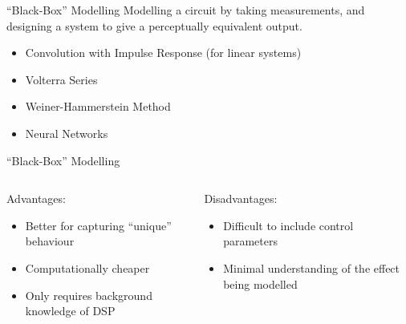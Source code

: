 \begin{frame}{``Black-Box'' Modelling}
    Modelling a circuit by taking measurements, and designing a system
    to give a perceptually equivalent output.
    \vspace{1ex}
    \begin{itemize}
        \itemsep0em
        \item Convolution with Impulse Response (for linear systems)
        \item Volterra Series
        \item Weiner-Hammerstein Method
        \item Neural Networks
    \end{itemize}
\end{frame}

\begin{frame}{``Black-Box'' Modelling}
    \begin{columns}
        \begin{column}{0.5\linewidth}
            \hspace{-1ex}
            Advantages:
            \vspace{1ex}
            \begin{itemize}
                \itemsep0.5em
                \item Better for capturing ``unique'' behaviour
                \item Computationally cheaper
                \item Only requires background knowledge of DSP
            \end{itemize}
        \end{column}
        \begin{column}{0.5\linewidth}
            \hspace{-1ex}
            Disadvantages:
            \vspace{1ex}
            \begin{itemize}
                \itemsep0.5em
                \item Difficult to include control parameters
                \item Minimal understanding of the effect being modelled
            \end{itemize}
        \end{column}
    \end{columns}
\end{frame}

